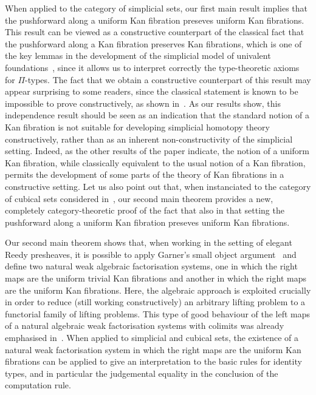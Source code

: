 \documentclass[reqno,10pt,a4paper,oneside,draft]{amsart}
\begin{document}
When applied to the category of simplicial sets, our first main result implies that the pushforward along a uniform Kan fibration preseves uniform Kan fibrations. This result can be viewed as a constructive counterpart of the classical fact that the pushforward along a Kan fibration preserves Kan fibrations, which is one of the key lemmas in the development of the simplicial model of univalent foundations~\cite[Lemma 2.3.1]{voevodsky-simplicial-model}, since it allows us to interpret correctly the type-theoretic axioms for $\Pi$-types. The fact that we obtain a constructive counterpart of this result may appear surprising to some readers, since the classical statement is known to be impossible to prove constructively, as shown in~\cite{coquand-non-constructivity-kan}.
As our results show, this independence result should be seen as an indication that the standard notion of a Kan fibration is not suitable for developing simplicial homotopy theory constructively, rather than as an inherent non-constructivity of the simplicial setting. Indeed, as the other results of the paper indicate, the notion of a uniform Kan fibration, while classically equivalent to the usual notion of a Kan fibration, permits the development of some parts of the theory of Kan fibrations in a constructive setting.
Let us also point out that, when instanciated to the category of cubical sets considered in~\cite{coquand-variation}, our second main theorem provides a new, completely category-theoretic proof of the fact that also in that setting the pushforward along a uniform Kan fibration preseves uniform Kan fibrations.


Our second main theorem shows that, when working in the setting of elegant Reedy presheaves, it is possible to apply Garner's small object argument~\cite{garner:small-object-argument} and define two natural weak algebraic factorisation systems, one in which the right maps are the uniform trivial Kan fibrations and another in which the right maps are the uniform Kan fibrations. Here, the algebraic approach is exploited crucially in order to reduce (still working constructively) an arbitrary lifting problem to a functorial family of lifting problems. This type of good behaviour of the left maps of a natural algebraic weak factorisation systems with colimits was already emphasised in~\cite{riehl-cat-homotopy}. When applied to simplicial and cubical sets, the existence of a natural weak factorisation system in which the right maps are the uniform Kan fibrations can be applied to give an interpretation to the basic rules for identity types, and in particular the judgemental equality in the conclusion of the computation rule.
\end{document}

